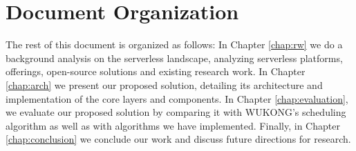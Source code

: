 
\section{Document Organization}
The rest of this document is organized as follows: In Chapter \ref{chap:rw} we do a background analysis on the serverless landscape, analyzing serverless platforms, offerings, open-source solutions and existing research work. In Chapter \ref{chap:arch} we present our proposed solution, detailing its architecture and implementation of the core layers and components. In Chapter \ref{chap:evaluation}, we evaluate our proposed solution by comparing it with WUKONG's scheduling algorithm as well as with algorithms we have implemented. Finally, in Chapter \ref{chap:conclusion} we conclude our work and discuss future directions for research.